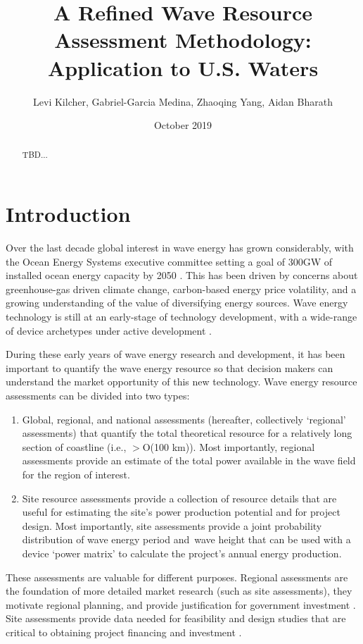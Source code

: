 \documentclass[authoryear,preprint]{elsarticle}
\title{A Refined Wave Resource Assessment Methodology: Application to U.S. Waters}
\author{Levi Kilcher, Gabriel-Garcia Medina, Zhaoqing Yang, Aidan Bharath}
\date{October 2019}
\begin{document}
\begin{abstract}
TBD...
\end{abstract}

\maketitle


\section{Introduction}

Over the last decade global interest in wave energy has grown considerably, with the Ocean Energy Systems executive committee setting a goal of 300GW of installed ocean energy capacity by 2050 \citep[]{huckerbyInternationalVisionOcean2017}. This has been driven by concerns about greenhouse-gas driven climate change, carbon-based energy price volatility, and a growing understanding of the value of diversifying energy sources. Wave energy technology is still at an early-stage of technology development, with a wide-range of device archetypes under active development \citep[]{babaritOceanWaveEnergy2017}. 

During these early years of wave energy research and development, it has been important to quantify the wave energy resource so that decision makers can understand the market opportunity of this new technology. Wave energy resource assessments can be divided into two types:

\begin{enumerate}
\item Global, regional, and national assessments (hereafter, collectively ‘regional’ assessments) that quantify the total theoretical resource for a relatively long section of coastline (i.e., $>$O(100 km)). Most importantly, regional assessments provide an estimate of the total power available in the wave field for the region of interest.
\item Site resource assessments provide a collection of resource details that are useful for estimating the site’s power production potential and for project design. Most importantly, site assessments provide a joint probability distribution of wave energy period and\ wave height that can be used with a device ‘power matrix’ to calculate the project’s annual energy production.
\end{enumerate}

These assessments are valuable for different purposes. Regional assessments are the foundation of more detailed market research (such as site assessments), they motivate regional planning, and provide justification for government investment \citep[e.g., ][]{EPRIwaveresource2011,gunnQuantifyingGlobalWave2012,regueroGlobalWavePower2015,motaWaveEnergyPotential2014}. Site assessments provide data needed for feasibility and design studies that are critical to obtaining project financing and investment \citep[]{robertsonCharacterizingShoreWave2014,iglesiasWaveEnergyPotential2009}.
\end{document}
